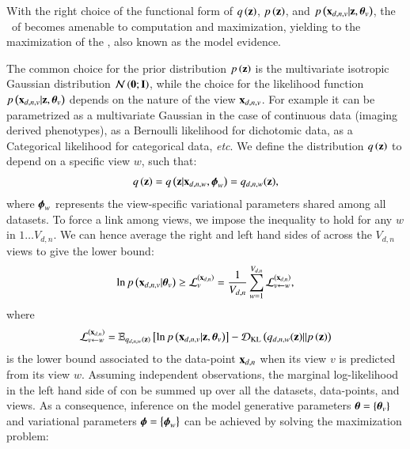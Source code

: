 With the right choice of the functional form of $q\left(\mathbf{z}\right)$, $p\left(\mathbf{z}\right)$, and $p\left(\mathbf{x}_{d,n,v}|\mathbf{z}, \boldsymbol{\theta}_v\right)$, the \rhs\ of  becomes amenable to computation and maximization, yielding to the maximization of the \lhs, also known as the model evidence.

The common choice for the prior distribution $p\left(\mathbf{z}\right)$ is the multivariate isotropic Gaussian distribution $\mathcal{N}\left(\mathbf{0};\mathbf{I}\right)$,
while the choice for the likelihood function $p\left(\mathbf{x}_{d,n,v}|\mathbf{z}, \boldsymbol{\theta}_v\right)$ depends on the nature of the view $\mathbf{x}_{d,n,v}$.
For example it can be parametrized as a multivariate Gaussian in the case of continuous data (\ie imaging derived phenotypes), as a Bernoulli likelihood for dichotomic data, as a Categorical likelihood for categorical data, \textit{etc}.
We define the distribution $q\left(\mathbf{z}\right)$ to depend on a specific view $w$, such that:
\begin{equation}\label{eq:q}
\begin{aligned}
q\left(\mathbf{z}\right) = q\left(\mathbf{z}|\mathbf{x}_{d,n,w}, \boldsymbol{\phi}_w\right) = q_{d,n,w}(\mathbf{z}),
\end{aligned}
\end{equation}
where $\boldsymbol{\phi}_w$ represents the view-specific variational parameters shared among all datasets.
To force a link among views, we impose the inequality  to hold for any $w$ in $1 \ldots V_{d,n}$.
We can hence average the right and left hand sides of  across the $V_{d,n}$ views to give the lower bound:
\begin{equation}\label{eq:newLB}
\begin{aligned}
\ln p\left(\mathbf{x}_{d,n,v}|\boldsymbol{\theta}_v\right) \geq \mathcal{L}_v^{(\mathbf{x}_{d,n})} = \frac{1}{V_{d,n}} \sum_{w=1}^{V_{d,n}} \mathcal{L}_{v \leftarrow w}^{(\mathbf{x}_{d,n})},
\end{aligned}
\end{equation}
where
\begin{equation}\label{eq:LBdnvw}
\begin{aligned}
\mathcal{L}_{v \leftarrow w}^{(\mathbf{x}_{d,n})} = \operatorname{\mathbb{E}}_{q_{d,n,w}(\mathbf{z})}\left[\ln p\left(\mathbf{x}_{d,n,v}|\mathbf{z}, \boldsymbol{\theta}_v\right)\right] - \operatorname{\mathcal{D}_{KL}}\left(q_{d,n,w}(\mathbf{z})||p\left(\mathbf{z}\right)\right)
\end{aligned}
\end{equation}
is the lower bound associated to the data-point $\mathbf{x}_{d,n}$ when its view $v$ is predicted from its view $w$.
Assuming independent observations, the marginal log-likelihood in the left hand side of  con be summed up over all the datasets, data-points, and views.
As a consequence, inference on the model generative parameters $\boldsymbol{\theta} = \left\{\boldsymbol{\theta}_v\right\}$ and variational parameters $\boldsymbol{\phi} = \left\{\boldsymbol{\phi}_w\right\}$ can be achieved by solving the maximization problem:
